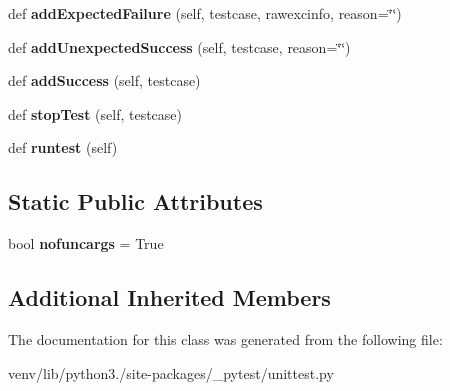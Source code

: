 \begin{DoxyCompactItemize}
\item 
\mbox{\label{class__pytest_1_1unittest_1_1_test_case_function_a6418cab1f8b9737472af19ca07eb124e}} 
def {\bfseries add\+Expected\+Failure} (self, testcase, rawexcinfo, reason=\char`\"{}\char`\"{})
\item 
\mbox{\label{class__pytest_1_1unittest_1_1_test_case_function_a983e01a2a982de13e78bc94c1778e5c3}} 
def {\bfseries add\+Unexpected\+Success} (self, testcase, reason=\char`\"{}\char`\"{})
\item 
\mbox{\label{class__pytest_1_1unittest_1_1_test_case_function_ae022378a4306d72e9d75e3df4794c542}} 
def {\bfseries add\+Success} (self, testcase)
\item 
\mbox{\label{class__pytest_1_1unittest_1_1_test_case_function_afefdc8bcd5d5e9f503d724a329a37027}} 
def {\bfseries stop\+Test} (self, testcase)
\item 
\mbox{\label{class__pytest_1_1unittest_1_1_test_case_function_afaed65968f50ef1b10a8a2334236b861}} 
def {\bfseries runtest} (self)
\end{DoxyCompactItemize}
\subsection*{Static Public Attributes}
\begin{DoxyCompactItemize}
\item 
\mbox{\label{class__pytest_1_1unittest_1_1_test_case_function_a7a640d6ea0ddbb7cfbb39fd11ef3b375}} 
bool {\bfseries nofuncargs} = True
\end{DoxyCompactItemize}
\subsection*{Additional Inherited Members}


The documentation for this class was generated from the following file\+:\begin{DoxyCompactItemize}
\item 
venv/lib/python3./site-\/packages/\+\_\+pytest/unittest.\+py\end{DoxyCompactItemize}
